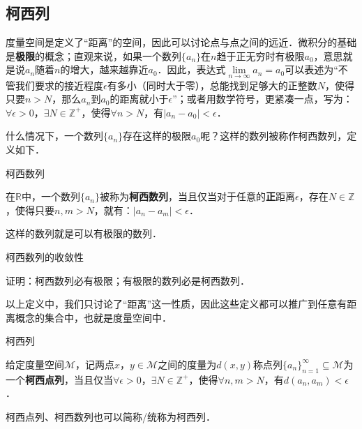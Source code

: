

\subsection{柯西列}

度量空间是定义了“距离”的空间，因此可以讨论点与点之间的远近．微积分的基础是\textbf{极限}的概念；直观来说，如果一个数列$\{a_n\}$在$n$趋于正无穷时有极限$a_0$，意思就是说$a_n$随着$n$的增大，越来越靠近$a_0$．因此，表达式$\lim\limits_{n\rightarrow\infty}a_n=a_0$可以表述为“不管我们要求的接近程度$\epsilon$有多小（同时大于零），总能找到足够大的正整数$N$，使得只要$n>N$，那么$a_n$到$a_0$的距离就小于$\epsilon$”；或者用数学符号，更紧凑一点，写为：$\forall\epsilon>0$，$\exists N\in\mathbb{Z}^+$，使得$\forall n>N$，有$|a_n-a_0|<\epsilon$．

什么情况下，一个数列$\{a_n\}$存在这样的极限$a_0$呢？这样的数列被称作柯西数列，定义如下．

\begin{definition}{柯西数列}

在$\mathbb{R}$中，一个数列$\{a_n\}$被称为\textbf{柯西数列}，当且仅当对于任意的\textbf{正}距离$\epsilon$，存在$N\in\mathbb{Z}$，使得只要$n, m>N$，就有：$|a_n-a_m|<\epsilon$．

\end{definition}

这样的数列就是可以有极限的数列．

\begin{exercise}{柯西数列的收敛性}

证明：柯西数列必有极限；有极限的数列必是柯西数列．

\end{exercise}

以上定义中，我们只讨论了“距离”这一性质，因此这些定义都可以推广到任意有距离概念的集合中，也就是度量空间中．

\begin{definition}{柯西列}

给定度量空间$\mathcal{M}$，记两点$x$，$y\in\mathcal{M}$之间的度量为$d(x, y)$称点列$\{a_n\}_{n=1}^{\infty}\subseteq\mathcal{M}$为一个\textbf{柯西点列}，当且仅当$\forall\epsilon>0$，$\exists N\in\mathbb{Z}^+$，使得$\forall n, m>N$，有$d(a_n, a_m)<\epsilon$．

\end{definition}


柯西点列、柯西数列也可以简称/统称为柯西列．